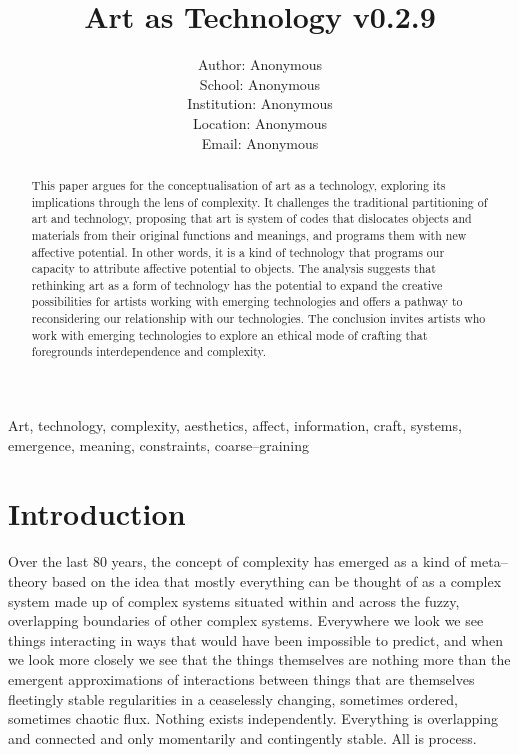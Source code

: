 \documentclass[letterpaper]{article}
\title{Art as Technology v0.2.9}
\author{Author: Anonymous\\
School: Anonymous\\
Institution: Anonymous\\
Location: Anonymous\\
Email: Anonymous\\
\newline
\newline
}
\begin{document}
 
\maketitle
\begin{abstract}

    This paper argues for the conceptualisation of art as a technology, exploring its implications through the lens of complexity. It challenges the traditional partitioning of art and technology, proposing that art is system of codes that dislocates objects and materials from their original functions and meanings, and programs them with new affective potential. In other words, it is a kind of technology that programs our capacity to attribute affective potential to objects. The analysis suggests that rethinking art as a form of technology has the potential to expand the creative possibilities for artists working with emerging technologies and offers a pathway to reconsidering our relationship with our technologies. The conclusion invites artists who work with emerging technologies to explore an ethical mode of crafting that foregrounds interdependence and complexity.

\end{abstract}


Art, technology, complexity, aesthetics, affect, information, craft, systems, emergence, meaning, constraints, coarse–graining

\section{Introduction}

    Over the last 80 years, the concept of complexity has emerged as a kind of meta–theory based on the idea that mostly everything can be thought of as a complex system made up of complex systems situated within and across the fuzzy, overlapping boundaries of other complex systems. Everywhere we look we see things interacting in ways that would have been impossible to predict, and when we look more closely we see that the things themselves are nothing more than the emergent approximations of interactions between things that are themselves fleetingly stable regularities in a ceaselessly changing, sometimes ordered, sometimes chaotic flux. Nothing exists independently. Everything is overlapping and connected and only momentarily and contingently stable. All is process.
    
\end{document}
